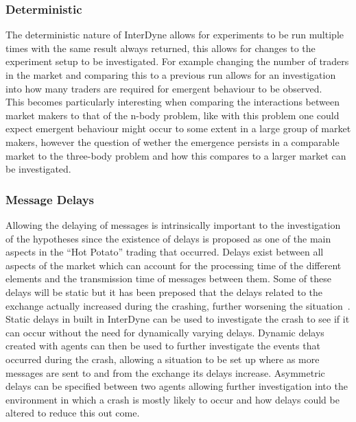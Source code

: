 \documentclass{article}
\begin{document}
\subsubsection{Deterministic}
The deterministic nature of InterDyne allows for experiments to be run multiple times with the same result always returned, this allows for changes to the experiment setup to be investigated. For example changing the number of traders in the market and comparing this to a previous run allows for an investigation into how many traders are required for emergent behaviour to be observed.\\
This becomes particularly interesting when comparing the interactions between market makers to that of the n-body problem, like with this problem one could expect emergent behaviour might occur to some extent in a large group of market makers, however the question of wether the emergence persists in a comparable market to the three-body problem and how this compares to a larger market can be investigated.   


\subsubsection{Message Delays}
Allowing the delaying of messages is intrinsically important to the investigation of the hypotheses since the existence of delays is proposed as one of the main aspects in the ``Hot Potato'' trading that occurred. Delays exist between all aspects of the market which can account for the processing time of the different elements and the transmission time of messages between them. Some of these delays will be static but it has been preposed that the delays related to the exchange actually increased during the crashing, further worsening the situation~\cite{SECreport_delays}.\\
Static delays in built in InterDyne can be used to investigate the crash to see if it can occur without the need for dynamically varying delays. Dynamic delays created with agents can then be used to further investigate the events that occurred during the crash, allowing a situation to be set up where as more messages are sent to and from the exchange its delays increase.  Asymmetric delays can be specified between two agents allowing further investigation into the environment in which a crash is mostly likely to occur and how delays could be altered to reduce this out come. 
\end{document}
